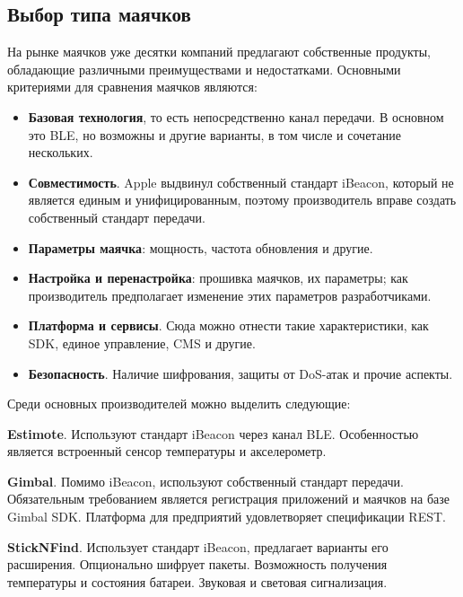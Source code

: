\subsection{Выбор типа маячков}

На рынке маячков уже десятки компаний предлагают собственные продукты, обладающие различными преимуществами и недостатками. Основными критериями для сравнения маячков являются:

\begin{itemize}
    \item
    \textbf{Базовая технология}, то есть непосредственно канал передачи. В основном это BLE, но возможны и другие варианты, в том числе и сочетание нескольких.
    \item
    \textbf{Совместимость}. Apple выдвинул собственный стандарт iBeacon, который не является единым и унифицированным, поэтому производитель вправе создать собственный стандарт передачи.
    \item
    \textbf{Параметры маячка}: мощность, частота обновления и другие.
    \item
    \textbf{Настройка и перенастройка}: прошивка маячков, их параметры; как производитель предполагает изменение этих параметров разработчиками.
    \item
    \textbf{Платформа и сервисы}. Сюда можно отнести такие характеристики, как SDK, единое управление, CMS и другие.
    \item
    \textbf{Безопасность}. Наличие шифрования, защиты от DoS-атак и прочие аспекты.
\end{itemize}

Среди основных производителей можно выделить следующие:

\textbf{Estimote}. Используют стандарт iBeacon через канал BLE. Особенностью является встроенный сенсор температуры и акселерометр.

\textbf{Gimbal}. Помимо iBeacon, используют собственный стандарт передачи. Обязательным требованием является регистрация приложений и маячков на базе Gimbal SDK. Платформа для предприятий удовлетворяет спецификации REST.

\textbf{StickNFind}. Использует стандарт iBeacon, предлагает варианты его расширения. Опционально шифрует пакеты. Возможность получения температуры и состояния батареи. Звуковая и световая сигнализация.